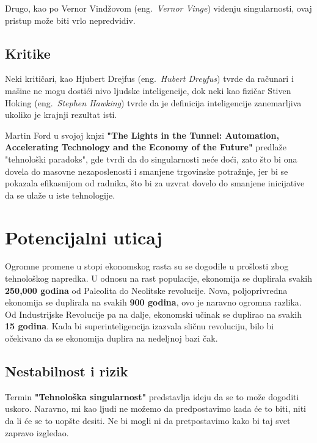 \documentclass[a4paper]{article}
\begin{document}
Drugo, kao po Vernor Vindžovom (eng.~{\em Vernor Vinge}) viđenju singularnosti, ovaj pristup može biti vrlo nepredvidiv. \cite{mog-8}

\subsection{Kritike}

Neki kritičari, kao Hjubert Drejfus (eng.~{\em Hubert Dreyfus}) tvrde da računari i mašine ne mogu dostići nivo ljudske inteligencije, dok neki kao fizičar Stiven Hoking (eng.~{\em Stephen Hawking}) tvrde da je definicija inteligencije zanemarljiva ukoliko je krajnji rezultat isti. 

Martin Ford u svojoj knjzi \textbf{"The Lights in the Tunnel: Automation, Accelerating Technology and the Economy of the Future"} predlaže "tehnološki paradoks", gde tvrdi da do singularnosti neće doći, zato što bi ona dovela do masovne nezaposlenosti i smanjene trgovinske potražnje, jer bi se pokazala efikasnijom od radnika, što bi za uzvrat dovelo do smanjene inicijative da se ulaže u iste tehnologije. \cite{mog-10}

\section{Potencijalni uticaj}
\label{sec:potencijalni_uticaj}
\hfill

Ogromne promene u stopi ekonomskog rasta su se dogodile u prošlosti zbog tehnološkog napredka. U odnosu na rast populacije, ekonomija se duplirala svakih \textbf{250,000 godina} od Paleolita do Neolitske revolucije. Nova, poljoprivredna ekonomija se duplirala na svakih \textbf{900 godina}, ovo je naravno ogromna razlika. Od Industrijske Revolucije pa na dalje, ekonomski učinak se duplirao na svakih \textbf{15 godina}. Kada bi superinteligencija izazvala sličnu revoluciju, bilo bi očekivano da se ekonomija duplira na nedeljnoj bazi čak.

\subsection{Nestabilnost i rizik}
\label{subsec:nestabilnost_i_rizik}
\hfill

Termin \textbf{"Tehnološka singularnost"} predstavlja ideju da se to može dogoditi uskoro. Naravno, mi kao ljudi ne možemo da predpostavimo kada će to biti, niti da li će se to uopšte desiti. Ne bi mogli ni da pretpostavimo kako bi taj svet zapravo izgledao. 
\end{document}
